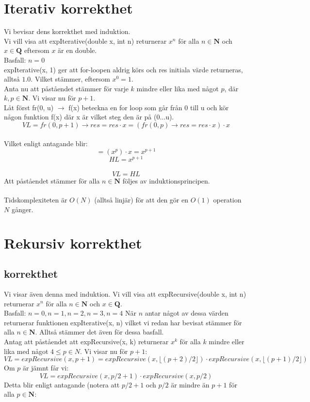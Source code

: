 \documentclass{article}
\begin{document}
\newpage

\section{Iterativ korrekthet}
Vi bevisar dens korrekthet med induktion.\\
Vi vill visa att expIterative(double x, int n) returnerar $x^n$ för alla $n \in \mathbf{N}$ och $x \in \mathbf{Q}$ eftersom $x$ är en double.\\
Basfall: $n = 0$\\
expIterative(x, 1) ger att for-loopen aldrig körs och res initiala värde returneras, alltså $1.0$. Vilket stämmer, eftersom $x^0 = 1$.
\\
Anta nu att påståendet stämmer för varje $k$ mindre eller lika med något $p$, där $k, p \in \mathbf{N}$. Vi visar nu för $p+1$.\\ 
Låt först fr(0, u) $\longrightarrow$ f(x) beteckna en for loop som går från 0 till u och kör någon funktion f(x) där x är vilket steg den är på (0...u).\\
\[VL = fr(0, p+1) \longrightarrow res =res\cdot x = (fr(0, p) \longrightarrow res = res\cdot x)\cdot x \] \\
Vilket enligt antagande blir:\\
\[ = (x^p)\cdot x = x^{p+1}\]
\[ HL = x^{p+1}\]\\
\[VL = HL\]
Att påståendet stämmer för alla $n \in \mathbf{N}$ följes av induktionsprincipen.\\ \\
Tidskomplexiteten är $O(N)$ (alltså linjär) för att den gör en $O(1)$ operation $N$ gånger.

\newpage

\section{Rekursiv korrekthet}
\subsection{korrekthet}
Vi visar även denna med induktion. Vi vill visa att expRecursive(double x, int n) returnerar $x^n$ för alla $n \in \mathbf{N}$ och $x \in \mathbf{Q}$.\\
Basfall: $n= 0, n = 1, n=2, n=3, n=4$ 
När $n$ antar något av dessa värden returnerar funktionen expIterative(x, n) vilket vi redan har bevisat stämmer för alla $n \in \mathbf{N}$. Alltså stämmer det även för dessa basfall.\\
Antag att påståendet att expRecursive(x, k) returnerar $x^k$ för alla $k$ mindre eller lika med något $4 \leq p \in N$. Vi visar nu för $p+1$:\\
\[ VL = expRecursive(x, p+1) = expRecursive(x, \lfloor{(p+2)/2 \rfloor}) \cdot expRecursive(x, \lfloor(p+1)/2\rfloor)\] Om $p$ är jämnt får vi: \[
VL = expRecursive(x, p/2+1)\cdot expRecursive(x, p/2)
\] 
Detta blir enligt antagande (notera att $p/2+1$ och $p/2$ är mindre än $p+1$ för alla $p \in \mathbf{N}$:\\
\end{document}
